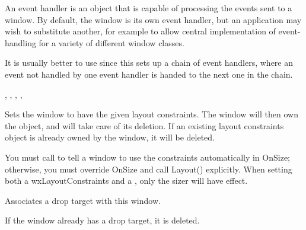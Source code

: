 

An event handler is an object that is capable of processing the events
sent to a window. By default, the window is its own event handler, but
an application may wish to substitute another, for example to allow
central implementation of event-handling for a variety of different
window classes.

It is usually better to use  since
this sets up a chain of event handlers, where an event not handled by one event handler is
handed to the next one in the chain.


,\rtfsp
{},\rtfsp
{},\rtfsp
{},\rtfsp
{}

\label{wxwindowsetconstraints}


Sets the window to have the given layout constraints. The window
will then own the object, and will take care of its deletion.
If an existing layout constraints object is already owned by the
window, it will be deleted.




You must call  to tell a window to use
the constraints automatically in OnSize; otherwise, you must override OnSize and call Layout()
explicitly. When setting both a wxLayoutConstraints and a , only the
sizer will have effect.

\label{wxwindowsetdroptarget}


Associates a drop target with this window.

If the window already has a drop target, it is deleted.

